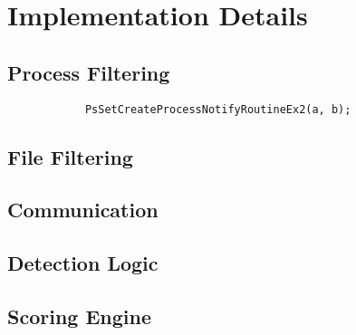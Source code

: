 \chapter{Implementation Details}
    \section{Process Filtering}
        \begin{lstlisting}
            PsSetCreateProcessNotifyRoutineEx2(a, b);
        \end{lstlisting}
    \section{File Filtering}
    \section{Communication}
    \section{Detection Logic}
    \section{Scoring Engine}